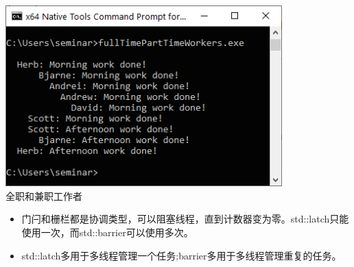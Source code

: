 \begin{center}
\includegraphics[width=0.8\textwidth]{content/3/chapter6/images/21.png}\\
全职和兼职工作者
\end{center}

\begin{tcolorbox}[breakable,enhanced jigsaw,colback=mygreen!5!white,colframe=mygreen!75!black,title={总结}]
	
\begin{itemize}
\item 
门闩和栅栏都是协调类型，可以阻塞线程，直到计数器变为零。std::latch只能使用一次，而std::barrier可以使用多次。

\item 
std::latch多用于多线程管理一个任务;barrier多用于多线程管理重复的任务。
\end{itemize}
	
\end{tcolorbox}

\newpage














